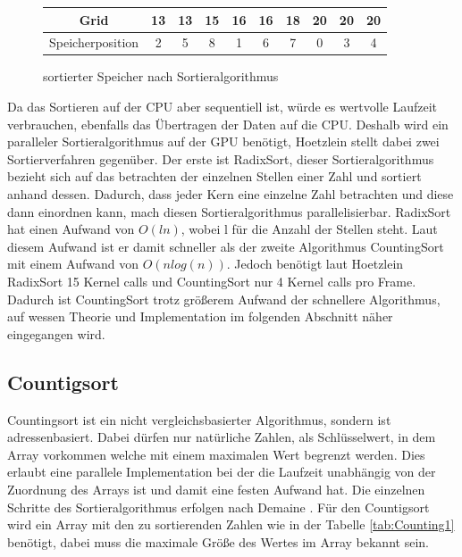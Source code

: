 \documentclass[intern,palatino]{cgBA}
\begin{document}
\begin{figure}[H]
	\centering
	\begin{tabular}{ | c || c | c | c | c | c | c | c | c | c |}
		\hline
		Grid 				&  13 & 13 & 15 & 16 & 16 & 18 & 20 & 20 & 20	\\ \hline
		Speicherposition	&   2 &  5 &  8 &  1 &  6 &  7 &  0 &  3 &  4	\\
		\hline
	\end{tabular}
	\caption{sortierter Speicher nach Sortieralgorithmus}
	\label{tab:Speichersorted}
\end{figure}

Da das Sortieren auf der CPU aber sequentiell ist, würde es wertvolle Laufzeit verbrauchen, ebenfalls das Übertragen der Daten auf die CPU. Deshalb wird ein paralleler Sortieralgorithmus auf der GPU benötigt, Hoetzlein \cite{nvidia} stellt dabei zwei Sortierverfahren gegenüber. Der erste ist RadixSort, dieser Sortieralgorithmus bezieht sich auf das betrachten der einzelnen Stellen einer Zahl und sortiert anhand dessen. Dadurch, dass jeder Kern eine einzelne Zahl betrachten und diese dann einordnen kann, mach diesen Sortieralgorithmus parallelisierbar.
RadixSort hat einen Aufwand von $O(l n)$, wobei l für die Anzahl der Stellen steht. Laut diesem Aufwand ist er damit schneller als der zweite Algorithmus CountingSort mit einem Aufwand von $O(n log(n))$. Jedoch benötigt laut Hoetzlein \cite{nvidia} RadixSort 15 Kernel calls und CountingSort nur 4 Kernel calls pro Frame. Dadurch ist CountingSort trotz größerem Aufwand der schnellere Algorithmus, auf wessen Theorie und Implementation im folgenden Abschnitt näher eingegangen wird.


\subsection{Countigsort}\label{counting}
Countingsort ist ein nicht vergleichsbasierter Algorithmus, sondern ist adressenbasiert. Dabei dürfen nur natürliche Zahlen, als Schlüsselwert, in dem Array vorkommen welche mit einem maximalen Wert begrenzt werden.
Dies erlaubt eine parallele Implementation bei der die Laufzeit unabhängig von der Zuordnung des Arrays ist und damit eine festen Aufwand hat.
Die einzelnen Schritte des Sortieralgorithmus erfolgen nach Demaine \cite{counting}.
\newline
Für den Countigsort wird ein Array mit den zu sortierenden Zahlen wie in der Tabelle \ref{tab:Counting1} benötigt, dabei muss die maximale Größe des Wertes im Array bekannt sein.
\newline
\end{document}
